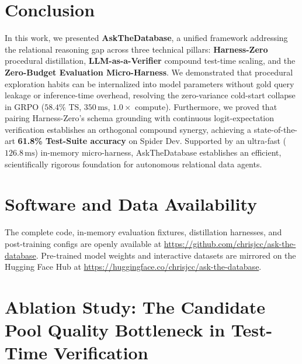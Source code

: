 \documentclass{article}
\theoremstyle{plain}
\theoremstyle{definition}
\theoremstyle{remark}
\begin{document}
\section{Conclusion}
\label{sec:conclusion}

In this work, we presented \textbf{AskTheDatabase}, a unified framework addressing the relational reasoning gap across three technical pillars: \textbf{Harness-Zero} procedural distillation, \textbf{LLM-as-a-Verifier} compound test-time scaling, and the \textbf{Zero-Budget Evaluation Micro-Harness}. We demonstrated that procedural exploration habits can be internalized into model parameters without gold query leakage or inference-time overhead, resolving the zero-variance cold-start collapse in GRPO ($58.4\%$ TS, $350\,\text{ms}$, $1.0\times$ compute). Furthermore, we proved that pairing Harness-Zero's schema grounding with continuous logit-expectation verification establishes an orthogonal compound synergy, achieving a state-of-the-art \textbf{61.8\% Test-Suite accuracy} on Spider Dev. Supported by an ultra-fast ($126.8\,\text{ms}$) in-memory micro-harness, AskTheDatabase establishes an efficient, scientifically rigorous foundation for autonomous relational data agents.

\section*{Software and Data Availability}
The complete code, in-memory evaluation fixtures, distillation harnesses, and post-training configs are openly available at \url{https://github.com/chrisjcc/ask-the-database}. Pre-trained model weights and interactive datasets are mirrored on the Hugging Face Hub at \url{https://huggingface.co/chrisjcc/ask-the-database}.




\newpage
\appendix
\onecolumn

\section{Ablation Study: The Candidate Pool Quality Bottleneck in Test-Time Verification}
\label{sec:appendix_verifier}
\end{document}
